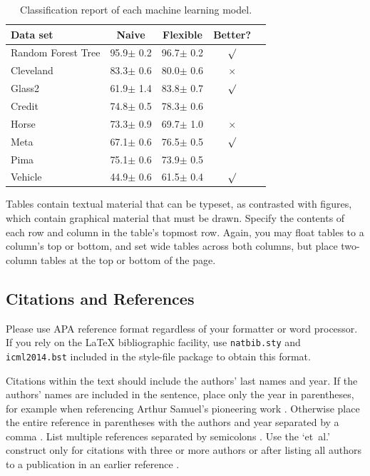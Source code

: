 \documentclass{article}
\begin{document}
\begin{table}[t]
\caption{Classification report of each machine learning model.}
\label{sample-table}
\vskip 0.15in
\begin{center}
\begin{small}
\begin{sc}
\begin{tabular}{lcccr}
\hline
\abovespace\belowspace
Data set & Naive & Flexible & Better? \\
\hline
\abovespace
Random Forest Tree    & 95.9$\pm$ 0.2& 96.7$\pm$ 0.2& $\surd$ \\
Cleveland & 83.3$\pm$ 0.6& 80.0$\pm$ 0.6& $\times$\\
Glass2    & 61.9$\pm$ 1.4& 83.8$\pm$ 0.7& $\surd$ \\
Credit    & 74.8$\pm$ 0.5& 78.3$\pm$ 0.6&         \\
Horse     & 73.3$\pm$ 0.9& 69.7$\pm$ 1.0& $\times$\\
Meta      & 67.1$\pm$ 0.6& 76.5$\pm$ 0.5& $\surd$ \\
Pima      & 75.1$\pm$ 0.6& 73.9$\pm$ 0.5&         \\
\belowspace
Vehicle   & 44.9$\pm$ 0.6& 61.5$\pm$ 0.4& $\surd$ \\
\hline
\end{tabular}
\end{sc}
\end{small}
\end{center}
\vskip -0.1in
\end{table}

Tables contain textual material that can be typeset, as contrasted 
with figures, which contain graphical material that must be drawn. 
Specify the contents of each row and column in the table's topmost
row. Again, you may float tables to a column's top or bottom, and set
wide tables across both columns, but place two-column tables at the
top or bottom of the page.
 
\subsection{Citations and References} 

Please use APA reference format regardless of your formatter
or word processor. If you rely on the \LaTeX\/ bibliographic 
facility, use {\tt natbib.sty} and {\tt icml2014.bst} 
included in the style-file package to obtain this format.

Citations within the text should include the authors' last names and
year. If the authors' names are included in the sentence, place only
the year in parentheses, for example when referencing Arthur Samuel's
pioneering work . Otherwise place the entire
reference in parentheses with the authors and year separated by a
comma \cite{Samuel59}. List multiple references separated by
semicolons \cite{kearns89,Samuel59,mitchell80}. Use the `et~al.'
construct only for citations with three or more authors or after
listing all authors to a publication in an earlier reference \cite{MachineLearningI}.
\end{document}
